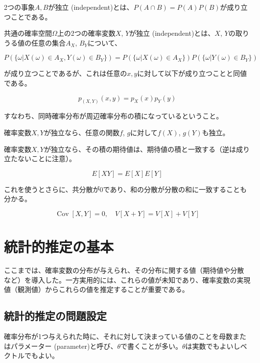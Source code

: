 \documentclass[uplatex,dvipdfmx]{jlreq}
\newcommand\term[1]{\textsf{#1}}
\begin{document}
2つの事象$A, B$が\term{独立 (independent)}とは、$P(A \cap B) = P(A)P(B)$が成り立つことである。

共通の確率空間$\Omega$上の2つの確率変数$X$, $Y$が\term{独立 (independent)}とは、$X$, $Y$の取りうる値の任意の集合$A_X$, $B_Y$について、

\begin{equation}
    P(\{\omega|X(\omega)\in A_X, Y(\omega)\in B_Y\}) =
    P(\{\omega|X(\omega)\in A_X\})P(\{\omega|Y(\omega)\in B_Y\})
\end{equation}

が成り立つことであるが、これは任意の$x, y$に対して以下が成り立つことと同値である。

\begin{equation}
    p_{(X, Y)}(x, y) = p_X(x) p_Y(y)
\end{equation}

すなわち、同時確率分布が周辺確率分布の積になっているということ。

確率変数$X, Y$が独立なら、任意の関数$f$, $g$に対して$f(X)$, $g(Y)$も独立。

確率変数$X, Y$が独立なら、その積の期待値は、期待値の積と一致する（逆は成り立たないことに注意）。

\begin{equation}
    E[XY] = E[X]E[Y]
\end{equation}

これを使うとさらに、共分散が0であり、和の分散が分散の和に一致することも分かる。

\begin{equation}
    \operatorname{Cov}[X, Y] = 0,\quad V[X + Y] = V[X] + V[Y]
\end{equation}

\section{統計的推定の基本}

ここまでは、確率変数の分布が与えられ、その分布に関する値（期待値や分散など）を導入した。一方実用的には、これらの値が未知であり、確率変数の実現値（観測値）からこれらの値を推定することが重要である。

\subsection{統計的推定の問題設定}

確率分布が1つ与えられた時に、それに対して決まっている値のことを\term{母数}または\term{パラメーター (parameter)}と呼び、$\theta$で書くことが多い。$\theta$は実数でもよいしベクトルでもよい。
\end{document}
